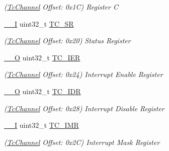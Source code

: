 \begin{DoxyCompactItemize}
\begin{DoxyCompactList}\small\item\em (\mbox{\hyperlink{structTcChannel}{Tc\+Channel}} Offset\+: 0x1C) Register C \end{DoxyCompactList}\item 
\mbox{\label{structTcChannel_a5d815f4adfe8158e5e3840c8a4541c4d}} 
\mbox{\hyperlink{core__cm7_8h_af63697ed9952cc71e1225efe205f6cd3}{\+\_\+\+\_\+I}} uint32\+\_\+t \mbox{\hyperlink{structTcChannel_a5d815f4adfe8158e5e3840c8a4541c4d}{T\+C\+\_\+\+SR}}
\begin{DoxyCompactList}\small\item\em (\mbox{\hyperlink{structTcChannel}{Tc\+Channel}} Offset\+: 0x20) Status Register \end{DoxyCompactList}\item 
\mbox{\label{structTcChannel_a2cfde4027b96b1524bbfdc812ca71f27}} 
\mbox{\hyperlink{core__cm7_8h_a7e25d9380f9ef903923964322e71f2f6}{\+\_\+\+\_\+O}} uint32\+\_\+t \mbox{\hyperlink{structTcChannel_a2cfde4027b96b1524bbfdc812ca71f27}{T\+C\+\_\+\+I\+ER}}
\begin{DoxyCompactList}\small\item\em (\mbox{\hyperlink{structTcChannel}{Tc\+Channel}} Offset\+: 0x24) Interrupt Enable Register \end{DoxyCompactList}\item 
\mbox{\label{structTcChannel_a669748c8212bbbb4c885ecfc2caf7f7f}} 
\mbox{\hyperlink{core__cm7_8h_a7e25d9380f9ef903923964322e71f2f6}{\+\_\+\+\_\+O}} uint32\+\_\+t \mbox{\hyperlink{structTcChannel_a669748c8212bbbb4c885ecfc2caf7f7f}{T\+C\+\_\+\+I\+DR}}
\begin{DoxyCompactList}\small\item\em (\mbox{\hyperlink{structTcChannel}{Tc\+Channel}} Offset\+: 0x28) Interrupt Disable Register \end{DoxyCompactList}\item 
\mbox{\label{structTcChannel_a811e37c3d871a48ff680ba99cd1a7907}} 
\mbox{\hyperlink{core__cm7_8h_af63697ed9952cc71e1225efe205f6cd3}{\+\_\+\+\_\+I}} uint32\+\_\+t \mbox{\hyperlink{structTcChannel_a811e37c3d871a48ff680ba99cd1a7907}{T\+C\+\_\+\+I\+MR}}
\begin{DoxyCompactList}\small\item\em (\mbox{\hyperlink{structTcChannel}{Tc\+Channel}} Offset\+: 0x2C) Interrupt Mask Register \end{DoxyCompactList}\item 

\end{DoxyCompactItemize}

